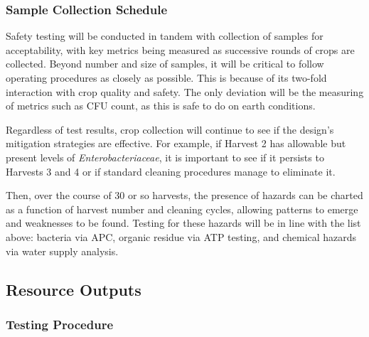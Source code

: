 \subsubsection{Sample Collection Schedule}
Safety testing will be conducted in tandem with collection of samples for acceptability, with key metrics being measured as successive rounds of crops are collected. Beyond number and size of samples, it will be critical to follow operating procedures as closely as possible. This is because of its two-fold interaction with crop quality and safety. The only deviation will be the measuring of metrics such as CFU count, as this is safe to do on earth conditions.

Regardless of test results, crop collection will continue to see if the design's mitigation strategies are effective. For example, if Harvest 2 has allowable but present levels of \textit{Enterobacteriaceae}, it is important to see if it persists to Harvests 3 and 4 or if standard cleaning procedures manage to eliminate it.

Then, over the course of 30 or so harvests, the presence of hazards can be charted as a function of harvest number and cleaning cycles, allowing patterns to emerge and weaknesses to be found. Testing for these hazards will be in line with the list above: bacteria via APC, organic residue via ATP testing, and chemical hazards via water supply analysis.



\clearpage

\subsection{Resource Outputs}

\subsubsection{Testing Procedure}


